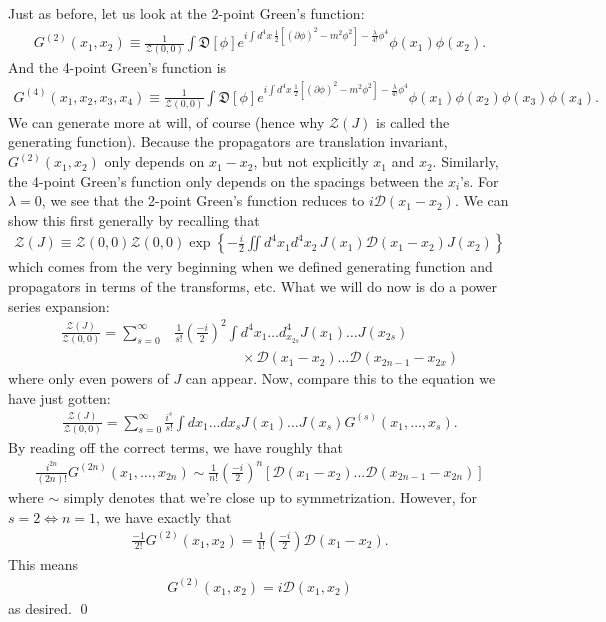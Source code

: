 \documentclass{book}
\theoremstyle{definition}
\newcommand{\p}{\partial}
\newcommand{\f}[2]{\frac{#1}{#2}}
\newcommand{\lp}{\left(}
\newcommand{\rp}{\right)}
\newcommand{\lb}{\left[}
\newcommand{\rb}{\right]}
\newcommand{\lc}{\left\{}
\newcommand{\rc}{\right\}}
\newcommand{\D}{\mathcal{D}}
\newcommand{\Z}{\mathcal{Z}}
\begin{document}
Just as before, let us look at the 2-point Green's function:
\begin{align}\label{g2}
G^{(2)}(x_1,x_2) \equiv \f{1}{\Z(0,0)} \int \mathfrak{D}[\phi] e^{ i\int d^4x\,  \f{1}{2}\lb(\p \phi)^2 - m^2 \phi^2 \rb - \f{\lambda}{4!}\phi^4} \phi(x_1)\phi(x_2).
\end{align}
And the 4-point Green's function is 
\begin{align}
G^{(4)}(x_1,x_2,x_3,x_4) \equiv \f{1}{\Z(0,0)} \int \mathfrak{D}[\phi] e^{ i\int d^4x\,  \f{1}{2}\lb(\p \phi)^2 - m^2 \phi^2 \rb - \f{\lambda}{4!}\phi^4} \phi(x_1)\phi(x_2)\phi(x_3)\phi(x_4).
\end{align}
We can generate more at will, of course (hence why $\Z(J)$ is called the generating function). Because the propagators are translation invariant, $G^{(2)}(x_1,x_2)$ only depends on $x_1 - x_2$, but not explicitly $x_1$ and $x_2$. Similarly, the 4-point Green's function only depends on the spacings between the $x_i$'s. For $\lambda = 0$, we see that the 2-point Green's function reduces to $i\D(x_1 - x_2)$. We can show this first generally by recalling that
\begin{align}
\Z(J) \equiv \Z(0,0)\Z(0,0)\exp\lc -\f{i}{2}\iint d^4x_1d^4x_2\, J(x_1)\D(x_1-x_2) J(x_2) \rc
\end{align}
which comes from the very beginning when we defined generating function and propagators in terms of the transforms, etc. What we will do now is do a power series expansion:
\begin{align}
\f{\Z(J)}{\Z(0,0)} = \sum^\infty_{s=0}&\f{1}{s!}\lp\f{-i}{2}\rp^2 \int d^4x_1\dots d^4_{x_{2s}}J(x_1)\dots J(x_{2s})\nonumber\\
&\hspace{2cm}\times \D(x_1 - x_2)\dots \D(x_{2n-1} - x_{2x})
\end{align}
where only even powers of $J$ can appear. Now, compare this to the equation we have just gotten:
\begin{align}
\f{\Z(J)}{\Z(0,0)} = 	\sum^\infty_{s=0}\f{i^s}{s!}\int dx_1\dots dx_s J(x_1)\dots J(x_s)  G^{(s)}(x_1,\dots,x_s).
\end{align}
By reading off the correct terms, we have roughly that
\begin{align}
\f{i^{2n}}{(2n)!}G^{(2n)}(x_1,\dots,x_{2n}) \sim \f{1}{n!}\lp \f{-i}{2} \rp^n \lb \D(x_1-x_2)  \dots \D(x_{2n-1} - x_{2n})\rb
\end{align}
where $\sim$ simply denotes that we're close up to symmetrization. However, for $s = 2 \iff n = 1$, we have exactly that
\begin{align}
\f{-1}{2!}G^{(2)}(x_1, x_2) = \f{1}{1!}\lp \f{-i}{2} \rp \D(x_1 - x_2).
\end{align}
This means 
\begin{align}
\boxed{G^{(2)}(x_1,x_2) = i\D(x_1 , x_2)}
\end{align}
as desired.  \qed\\
\end{document}

